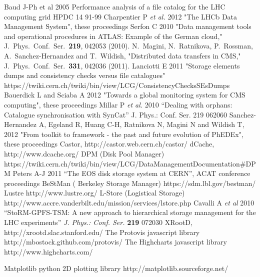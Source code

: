 \begin{thebibliography}{1}
 Baud J-Ph et al 2005 Performance analysis of a file catalog for the LHC computing grid HPDC
14 91-99
 Charpentier P  {\it et al.} 2012 "The LHCb Data Management System",  these proceedings 
  Serfon C 2010
  "Data management tools and operational procedures in ATLAS: Example of the German cloud,"
  J.\ Phys.\ Conf.\ Ser.\  {\bf 219}, 042053 (2010).
  N.~Magini, N.~Ratnikova, P.~Rossman, A.~Sanchez-Hernandez and T.~Wildish,
  "Distributed data transfers in CMS,"
  J.\ Phys.\ Conf.\ Ser.\  {\bf 331}, 042036 (2011).
 Lanciotti E 2011 "Storage elements dumps and consistency checks versus file catalogues"
https://twiki.cern.ch/twiki/bin/view/LCG/ConsistencyChecksSEsDumps
Bauerdick L and Sciaba A 2012 "Towards a global monitoring system for CMS computing", these proceedings
 Millar P {\it et al.} 2010 ``Dealing with orphans: Catalogue synchronisation with SynCat'' J. Phys.: Conf. Ser. 219 062060
 Sanchez-Hernandez A, Egeland R, Huang C-H, Ratnikova N, Magini N and Wildish T, 2012 "From toolkit to framework - the past and future evolution of PhEDEx", these proceedings
 Castor, http://castor.web.cern.ch/castor/
 dCache,  http://www.dcache.org/
 DPM (Disk Pool Manager) https://twiki.cern.ch/twiki/bin/view/LCG/DataManagementDocumentation\#DPM
 Peters A-J  2011 ``The EOS disk storage system at CERN'',  ACAT conference proceedings
 BeStMan ( Berkeley Storage Manager) https://sdm.lbl.gov/bestman/
 Lustre http://www.lustre.org/ 
 L-Store (Logistical Storage)  http://www.accre.vanderbilt.edu/mission/services/lstore.php
  Cavalli A  {\it et al} 2010  ``StoRM-GPFS-TSM: A new approach to hierarchical storage management for the LHC experiments''  {\it J. Phys.: Conf. Ser.} {\bf 219} 072030
 XRootD,  http://xrootd.slac.stanford.edu/
 The Protovis javascript library http://mbostock.github.com/protovis/
 The Highcharts javascript library http://www.highcharts.com/

 Matplotlib python 2D plotting library http://matplotlib.sourceforge.net/


\end{thebibliography}



